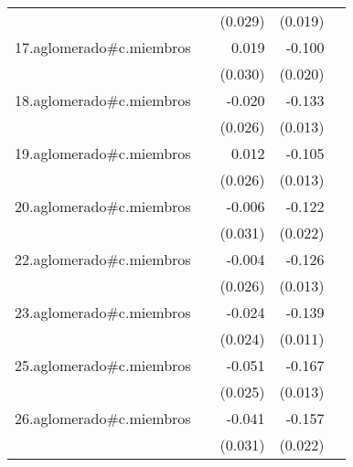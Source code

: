 {\begin{longtable}{l*{4}{D{.}{.}{-1}}}
            &                     &     (0.029)         &     (0.019)         &                     \\
\addlinespace
17.aglomerado#c.miembros&                     &       0.019         &      -0.100\sym{***}&                     \\
            &                     &     (0.030)         &     (0.020)         &                     \\
\addlinespace
18.aglomerado#c.miembros&                     &      -0.020         &      -0.133\sym{***}&                     \\
            &                     &     (0.026)         &     (0.013)         &                     \\
\addlinespace
19.aglomerado#c.miembros&                     &       0.012         &      -0.105\sym{***}&                     \\
            &                     &     (0.026)         &     (0.013)         &                     \\
\addlinespace
20.aglomerado#c.miembros&                     &      -0.006         &      -0.122\sym{***}&                     \\
            &                     &     (0.031)         &     (0.022)         &                     \\
\addlinespace
22.aglomerado#c.miembros&                     &      -0.004         &      -0.126\sym{***}&                     \\
            &                     &     (0.026)         &     (0.013)         &                     \\
\addlinespace
23.aglomerado#c.miembros&                     &      -0.024         &      -0.139\sym{***}&                     \\
            &                     &     (0.024)         &     (0.011)         &                     \\
\addlinespace
25.aglomerado#c.miembros&                     &      -0.051\sym{*}  &      -0.167\sym{***}&                     \\
            &                     &     (0.025)         &     (0.013)         &                     \\
\addlinespace
26.aglomerado#c.miembros&                     &      -0.041         &      -0.157\sym{***}&                     \\
            &                     &     (0.031)         &     (0.022)         &                     \\

\end{longtable}}
